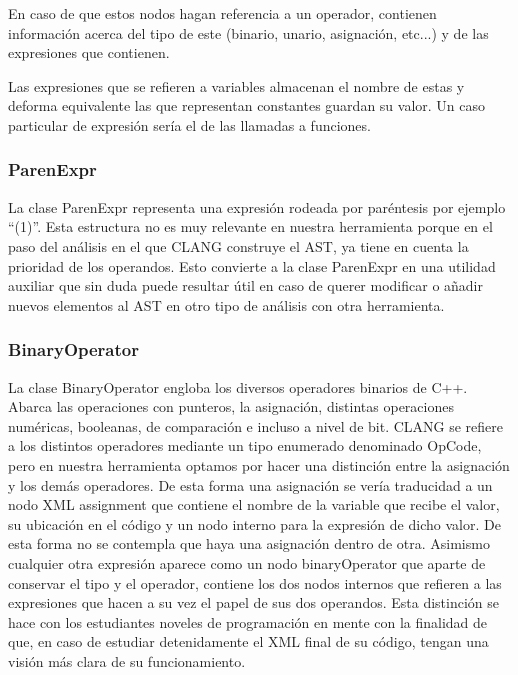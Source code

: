 En caso de que estos nodos hagan referencia a un operador, contienen informaci\'on acerca del tipo de este (binario, unario, asignaci\'on, etc...) y de las expresiones que contienen.

Las expresiones que se refieren a variables almacenan el nombre de estas y deforma equivalente las que representan constantes guardan su valor. Un caso particular de expresi\'on ser\'ia el de las llamadas a funciones.

\subsubsection*{ParenExpr}

La clase ParenExpr representa una expresi\'on rodeada por par\'entesis por ejemplo ``(1)''. Esta estructura no es muy relevante en nuestra herramienta porque en el paso del an\'alisis en el que CLANG construye el AST, ya tiene en cuenta la prioridad de los operandos. Esto convierte a la clase ParenExpr en una utilidad auxiliar que sin duda puede resultar \'util en caso de querer modificar o añadir nuevos elementos al AST en otro tipo de an\'alisis con otra herramienta.

\subsubsection*{BinaryOperator}

La clase BinaryOperator engloba los diversos operadores binarios de C++. Abarca las operaciones con punteros, la asignaci\'on, distintas operaciones num\'ericas, booleanas, de comparaci\'on e incluso a nivel de bit. CLANG se refiere a los distintos operadores mediante un tipo enumerado denominado OpCode, pero en nuestra herramienta optamos por hacer una distinci\'on entre la asignaci\'on y los dem\'as operadores. De esta forma una asignaci\'on se ver\'ia traducidad a un nodo XML assignment que contiene el nombre de la variable que recibe el valor, su ubicaci\'on en el c\'odigo y un nodo interno para la expresi\'on de dicho valor. De esta forma no se contempla que haya una asignaci\'on dentro de otra. Asimismo cualquier otra expresi\'on aparece como un nodo binaryOperator que aparte de conservar el tipo y el operador, contiene los dos nodos internos que refieren a las expresiones que hacen a su vez el papel de sus dos operandos. Esta distinci\'on se hace con los estudiantes noveles de programaci\'on en mente con la finalidad de que, en caso de estudiar detenidamente el XML final de su c\'odigo, tengan una visi\'on m\'as clara de su funcionamiento.

